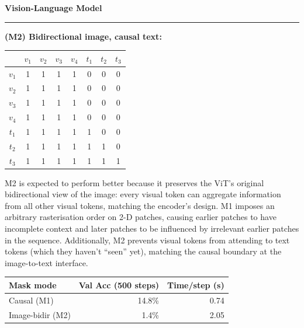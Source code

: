\documentclass[11pt]{article}
\newenvironment{question}[1]
    {
        \begin{center}
        \textbf{#1} \rmfamily
        \bigskip
        \hrule
    }
    {
        \end{center}
    }
\begin{document}
\begin{question}{Vision-Language Model}
\begin{enumerate}[label=(\alph*)]
    \textbf{(M2) Bidirectional image, causal text:}

    \begin{center}
    \setlength{\tabcolsep}{4pt}
    \begin{tabular}{c|ccccccc}
     & $v_1$ & $v_2$ & $v_3$ & $v_4$ & $t_1$ & $t_2$ & $t_3$ \\\hline
    $v_1$ & \cellcolor{gray!35}1 & \cellcolor{gray!35}1 & \cellcolor{gray!35}1 & \cellcolor{gray!35}1 & 0 & 0 & 0 \\
    $v_2$ & \cellcolor{gray!35}1 & \cellcolor{gray!35}1 & \cellcolor{gray!35}1 & \cellcolor{gray!35}1 & 0 & 0 & 0 \\
    $v_3$ & \cellcolor{gray!35}1 & \cellcolor{gray!35}1 & \cellcolor{gray!35}1 & \cellcolor{gray!35}1 & 0 & 0 & 0 \\
    $v_4$ & \cellcolor{gray!35}1 & \cellcolor{gray!35}1 & \cellcolor{gray!35}1 & \cellcolor{gray!35}1 & 0 & 0 & 0 \\
    $t_1$ & \cellcolor{gray!35}1 & \cellcolor{gray!35}1 & \cellcolor{gray!35}1 & \cellcolor{gray!35}1 & \cellcolor{gray!35}1 & 0 & 0 \\
    $t_2$ & \cellcolor{gray!35}1 & \cellcolor{gray!35}1 & \cellcolor{gray!35}1 & \cellcolor{gray!35}1 & \cellcolor{gray!35}1 & \cellcolor{gray!35}1 & 0 \\
    $t_3$ & \cellcolor{gray!35}1 & \cellcolor{gray!35}1 & \cellcolor{gray!35}1 & \cellcolor{gray!35}1 & \cellcolor{gray!35}1 & \cellcolor{gray!35}1 & \cellcolor{gray!35}1 \\
    \end{tabular}
    \end{center}

    M2 is expected to perform better because it preserves the ViT's original bidirectional view of the image: every visual token can aggregate information from all other visual tokens, matching the encoder's design. M1 imposes an arbitrary rasterisation order on 2-D patches, causing earlier patches to have incomplete context and later patches to be influenced by irrelevant earlier patches in the sequence. Additionally, M2 prevents visual tokens from attending to text tokens (which they haven't ``seen'' yet), matching the causal boundary at the image-to-text interface.

    \begin{center}
    \begin{tabular}{lrr}
    \toprule
    Mask mode & Val Acc (500 steps) & Time/step (s) \\
    \midrule
    Causal (M1)        & 14.8\% & 0.74 \\
    Image-bidir (M2)   &  1.4\% & 2.05 \\
    \bottomrule
    \end{tabular}
    \end{center}


\end{enumerate}
\end{question}
\end{document}

